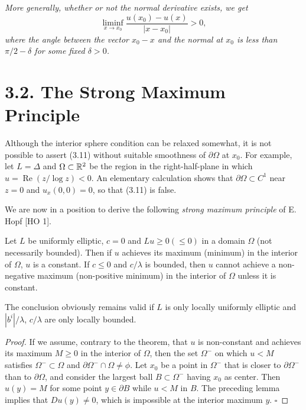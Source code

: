 \medskip

\emph{More generally, whether or not the normal derivative exists, we get}
\[
\tag{3.11}
\liminf_{x\to x_0}\frac{u(x_0)-u(x)}{\lvert x-x_0\rvert}>0,
\]
\emph{where the angle between the vector $x_0-x$ and the normal at $x_0$ is less than $\pi/2-\delta$ for some fixed $\delta>0$.}


\section*{3.2. The Strong Maximum Principle}

Although the interior sphere condition can be relaxed somewhat, it is not possible to assert (3.11) without suitable smoothness of $\partial\Omega$ at $x_0$. For example, let $L=\Delta$ and $\Omega \subset \mathbb{R}^2$ be the region in the right-half-plane in which $u=\operatorname{Re}(z/\log z)<0$. An elementary calculation shows that $\partial\Omega \subset C^1$ near $z=0$ and $u_x(0,0)=0$, so that (3.11) is false.

We are now in a position to derive the following \emph{strong maximum principle} of E. Hopf [HO 1].

\begin{theorem}\label{gt-ch3-smp}
Let $L$ be uniformly elliptic, $c=0$ and $Lu\ge 0(\le 0)$ in a domain $\Omega$ (not necessarily bounded). Then if $u$ achieves its maximum (minimum) in the interior of $\Omega$, $u$ is a constant. If $c\le 0$ and $c/\lambda$ is bounded, then $u$ cannot achieve a non-negative maximum (non-positive minimum) in the interior of $\Omega$ unless it is constant.
\end{theorem}

The conclusion obviously remains valid if $L$ is only locally uniformly elliptic and $|b^i|/\lambda$, $c/\lambda$ are only locally bounded.

\begin{proof}
If we assume, contrary to the theorem, that $u$ is non-constant and achieves its maximum $M\ge 0$ in the interior of $\Omega$, then the set $\Omega^-$ on which $u<M$ satisfies $\Omega^- \subset \Omega$ and $\partial\Omega^- \cap \Omega \ne \phi$. Let $x_0$ be a point in $\Omega^-$ that is closer to $\partial\Omega^-$ than to $\partial\Omega$, and consider the largest ball $B\subset \Omega^-$ having $x_0$ as center. Then $u(y)=M$ for some point $y\in \partial B$ while $u<M$ in $B$. The preceding lemma implies that $Du(y)\ne 0$, which is impossible at the interior maximum $y$. $\square$
\end{proof}


